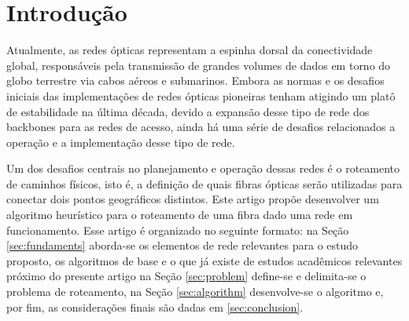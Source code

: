 \section{Introdução}

Atualmente, as redes ópticas representam a espinha dorsal da conectividade
global, responsáveis pela transmissão de grandes volumes de dados em torno do
globo terrestre via cabos aéreos e submarinos. Embora as normas e os desafios
iniciais das implementações de redes ópticas pioneiras tenham atigindo um platô
de estabilidade na última década, devido a expansão desse tipo de rede dos
backbones para as redes de acesso, ainda há uma série de desafios relacionados
a operação e a implementação desse tipo de rede.

Um dos desafios centrais no planejamento e operação dessas redes é o roteamento
de caminhos físicos, isto é, a definição de quais fibras ópticas serão
utilizadas para conectar dois pontos geográficos distintos. Este artigo propõe
desenvolver um algoritmo heurístico para o roteamento de uma fibra dado uma
rede em funcionamento. Esse artigo é organizado no seguinte formato: na Seção
\ref{sec:fundaments} aborda-se os elementos de rede relevantes para o estudo
proposto, os algoritmos de base e o que já existe de estudos acadêmicos
relevantes próximo do presente artigo na Seção \ref{sec:problem} define-se e
delimita-se o problema de roteamento, na Seção \ref{sec:algorithm}
desenvolve-se o algoritmo e, por fim, as considerações finais são dadas em
\ref{sec:conclusion}.

